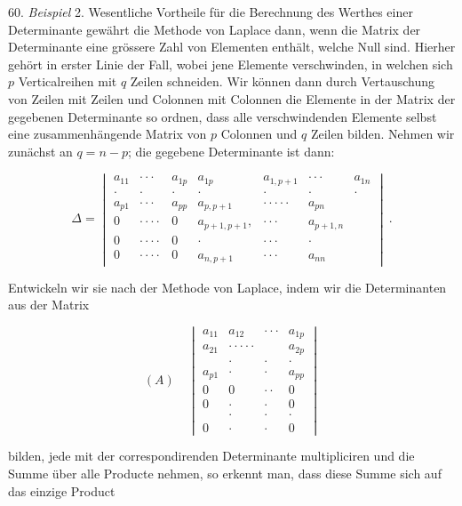60. \textit{Beispiel} 2. Wesentliche Vortheile f\"ur die Berechnung des Werthes einer
Determinante gew\"ahrt die Methode von Laplace dann, wenn die Matrix der Determinante eine
gr\"ossere Zahl von Elementen enth\"alt, welche Null sind. Hierher geh\"ort in erster Linie
der Fall, wobei jene Elemente verschwinden, in welchen sich $p$ Verticalreihen mit $q$
Zeilen schneiden. Wir k\"onnen dann durch Vertauschung von Zeilen mit Zeilen und Colonnen mit
Colonnen die Elemente in der Matrix der gegebenen Determinante so ordnen, dass alle
verschwindenden Elemente selbst eine zusammenh\"angende Matrix von $p$ Colonnen und $q$
Zeilen bilden. Nehmen wir zun\"achst an $q = n - p$; die gegebene Determinante ist dann:

\[
\Delta = \begin{vmatrix}
a_{11} & \cdot\cdot\cdot & a_{1p} & a_{1p} & a_{1,p+1} & \cdot\cdot\cdot & a_{1n} \\
\cdot & \cdot & \cdot & \cdot & \cdot & \cdot & \cdot \\
a_{p1} & \cdot\cdot\cdot & a_{pp} & a_{p,p+1} & \cdot\cdot\cdot\cdot\cdot & a_{pn} \\
0 & \cdot\cdot\cdot\cdot & 0 & a_{p+1,p+1}, & \cdot\cdot\cdot & a_{p+1,n} \\
0 & \cdot\cdot\cdot\cdot & 0 & \cdot & \cdot\cdot\cdot & \cdot \\
0 & \cdot\cdot\cdot\cdot & 0 & a_{n,p+1} & \cdot\cdot\cdot & a_{nn}
\end{vmatrix}\ .
\]


Entwickeln wir sie nach der Methode von Laplace, indem wir die Determinanten aus der Matrix

\[
(A)\quad
\begin{vmatrix}
a_{11} & a_{12} & \cdot\cdot\cdot & a_{1p} \\
a_{21} & \cdot\cdot\cdot\cdot\cdot & & a_{2p} \\
& \cdot & \cdot & \cdot \\
a_{p1} & \cdot & \cdot & a_{pp} \\
0 & 0 & \cdot\cdot & 0 \\
0 & \cdot & \cdot & 0 \\
& \cdot & \cdot & \cdot \\
0 & \cdot & \cdot & 0
\end{vmatrix}
\]

bilden, jede mit der correspondirenden Determinante multipliciren und die Summe \"uber alle
Producte nehmen, so erkennt man, dass diese Summe sich auf das einzige Product

